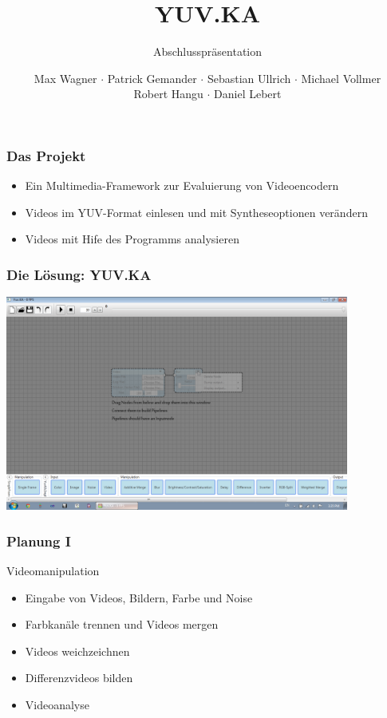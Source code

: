 \documentclass[t]{beamer}
\title{YUV.KA}
\subtitle{Abschlusspräsentation}
\author{Max Wagner $\cdot$ Patrick Gemander $\cdot$ Sebastian Ullrich $\cdot$ Michael Vollmer \\ Robert Hangu $\cdot$ Daniel Lebert}
\institute[ITEC]{Institut für Technische Informatik}
\begin{document}
\begin{frame}
	\maketitle
\end{frame}

\begin{frame}
	\frametitle{Das Projekt}
	
	\begin{itemize}
		\item<+-> Ein Multimedia-Framework zur Evaluierung von Videoencodern
		\item<+-> Videos im YUV-Format einlesen und mit Syntheseoptionen verändern
		\item<+-> Videos mit Hife des Programms analysieren
	\end{itemize}
\end{frame}

\begin{frame}
	\frametitle{Die Lösung: YUV.KA}
	
	\includegraphics[width=11.3cm]{startup_screenshot.png}
\end{frame}

\begin{frame}
	\frametitle{Planung I}
	Videomanipulation ~\\
	\begin{itemize}
		\item<+-> Eingabe von Videos, Bildern, Farbe und Noise
		\item<+-> Farbkanäle trennen und Videos mergen
		\item<+-> Videos weichzeichnen
		\item<+-> Differenzvideos bilden
		\item<+-> Videoanalyse
	\end{itemize}
\end{frame}
\end{document}
